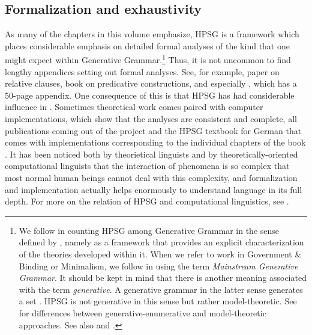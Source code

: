 \documentclass[output=paper
	        ,collection
	        ,collectionchapter
 	        ,biblatex
                ,babelshorthands
                ,newtxmath
                ,draftmode
                ,colorlinks, citecolor=brown
]{langscibook}
\begin{document}
\subsection{Formalization and exhaustivity}
\label{sec-form-exhaust}

As many of the chapters in this volume emphasize, HPSG is a framework which places considerable
emphasis on detailed formal analyses of the kind that one might expect within Generative
Grammar.\footnote{%
We follow \citet[]{GSag2000a-u} in counting HPSG among Generative Grammar in the sense
defined by \citet[]{Chomsky65a}, namely as a framework that provides an explicit
characterization of the theories developed within it.
When we refer to work in Government \& Binding or Minimalism, we follow \citet[]{CJ2005a} in using
the term \emph{Mainstream Generative Grammar}. It should be kept in mind that there is another
meaning associated with the term \emph{generative}. A generative grammar in the latter sense
generates a set \citep[]{Chomsky57a}. HPSG is not generative in this sense but rather model-theoretic. See \citet{PS2001a}
for differences between generative-enumerative and model-theoretic approaches. See also
 and .
}
Thus, it is not uncommon to find lengthy appendices setting out formal analyses. See, for
example,  paper on  relative clauses,
 book on predicative constructions, and especially \citet{GSag2000a-u},
which has a 50-page appendix. One consequence of this is that HPSG has had 
considerable influence in . Sometimes theoretical work comes paired
with computer implementations, which show that the analyses are consistent and complete, \eg all
publications coming out of the  project \citep{MuellerCoreGram} and the HPSG textbook
for German that comes with implementations corresponding to the individual chapters of the book
\citep{MuellerGrammix}. It has been noticed both by theorietical linguists \citep[]{Bierwisch63a} and
by theoretically-oriented computational linguists \citep[]{Abney96a} that the interaction of phenomena
is so complex that most normal human beings cannot deal with this complexity, and formalization and
implementation actually helps enormously to understand language in its full depth. For more on the
relation of HPSG and computational linguistics, see .
\end{document}
